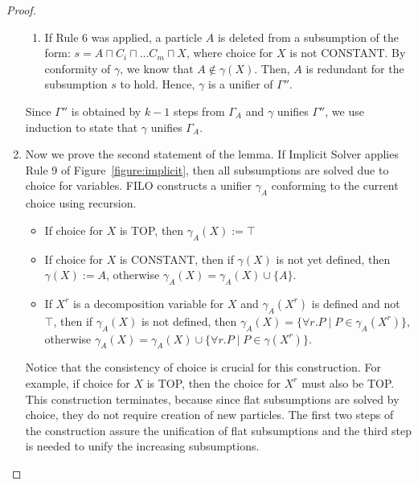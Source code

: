 \documentclass{article}
\begin{document}
\begin{proof}
\begin{enumerate}
\begin{enumerate}
		\item If Rule 6 was applied, a particle $A$ is deleted from a subsumption of the form: $s = A \sqcap C_i \sqcap ... C_m \sqcap X$, where choice for $X$ is not CONSTANT. By conformity of $\gamma$, we know that  $A \not\in \gamma(X)$. %
		Then, $A$ is redundant for the subsumption $s$ to hold. Hence, $\gamma$ is a unifier of $\Gamma''$.
	\end{enumerate}
	
	Since $\Gamma''$ is obtained by $k-1$ steps from $\Gamma_A$ and $\gamma$ unifies $\Gamma''$, we use  induction to state that $\gamma$ unifies $\Gamma_A$.
	
	\item Now we prove the second statement of the lemma.
If Implicit Solver applies Rule 9 of Figure~\ref{figure:implicit}, then all subsumptions are solved due to choice for variables. 
FILO constructs a unifier $\gamma_A$ conforming to the current choice using recursion.
\begin{itemize}
	\item If choice for $X$ is TOP, then $\gamma_A(X) := \top$
	\item If choice for $X$ is CONSTANT, then if $\gamma(X)$ is not yet defined, then
	$\gamma(X) := A$, otherwise $\gamma_A(X) = \gamma_A(X) \cup \{A\}$.
	\item If $X^r$ is a decomposition variable for $X$ and $\gamma_A(X^r)$ is defined and not $\top$,
	then if $\gamma_A(X)$ is not defined, then  $\gamma_A(X) = \{\forall r.P \mid P \in \gamma_A(X^r)\}$, otherwise  $\gamma_A(X) = \gamma_A(X) \cup \{\forall r.P \mid P \in \gamma(X^r)\}$.
\end{itemize}
Notice that the consistency of choice is crucial for this construction. For example, if choice for $X$ is TOP, then the choice for $X^r$ must also be TOP.
This construction terminates, because since flat subsumptions are solved by choice, they do not require creation of new particles. The first two steps of the construction assure the unification of flat subsumptions and the third step is needed to unify the increasing subsumptions.	
	\end{enumerate}
\end{proof}
\end{document}
